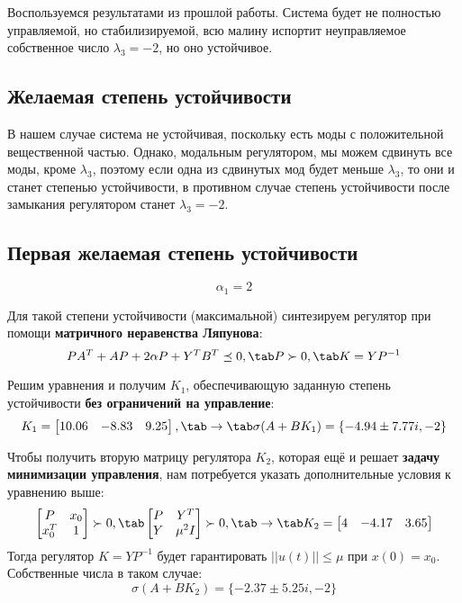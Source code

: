 Воспользуемся результатами из прошлой работы. Система будет не полностью управляемой, но стабилизируемой, всю малину испортит неуправляемое собственное число $\lambda_3 = -2$, но оно устойчивое.

\subsection{Желаемая степень устойчивости}

В нашем случае система не устойчивая, поскольку есть моды с положительной вещественной частью. Однако, модальным регулятором, 
мы можем сдвинуть все моды, кроме $\lambda_3$, поэтому если одна из сдвинутых мод будет меньше $\lambda_3$, то они и станет степенью устойчивости, в противном случае
степень устойчивости после замыкания регулятором станет $\lambda_3 = -2$. 

\subsection{Первая желаемая степень устойчивости}
$$
    \alpha_1 = 2
$$

Для такой степени устойчивости (максимальной) синтезируем регулятор при помощи \textbf{матричного неравенства Ляпунова}:
$$
  PA^T + AP + 2\alpha P + Y^TB^T \preceq 0, \tab P \succ 0, \tab K=YP^{-1}
$$

Решим уравнения и получим $K_1$, обеспечивающую заданную степень устойчивости \textbf{без ограничений на управление}:
$$
  K_1 = \begin{bmatrix}
    10.06 & -8.83 & 9.25
  \end{bmatrix}, \tab\rightarrow\tab \sigma(A+BK_1)=\{ -4.94 \pm 7.77i, -2 \}
$$

Чтобы получить вторую матрицу регулятора $K_2$, которая ещё и решает \textbf{задачу минимизации управления}, нам потребуется указать дополнительные условия к уравнению выше:
$$
  \begin{bmatrix}
    P & x_0 \\
    x_0^T & 1
  \end{bmatrix} \succ 0, \tab
  \begin{bmatrix}
    P & Y^T \\
    Y &\mu^2I
  \end{bmatrix} \succ 0, \tab \rightarrow \tab 
  K_2 = \begin{bmatrix}
    4 & -4.17 & 3.65
  \end{bmatrix}
$$ Тогда регулятор  $K = YP^{-1}$ будет гарантировать $||u(t)|| \leq \mu$ при $x(0)=x_0$.
Собственные числа в таком случае:
$$
  \sigma(A+BK_2)=\{ -2.37 \pm 5.25i, -2 \}
$$

